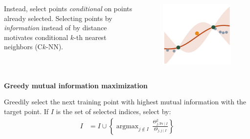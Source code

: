 \documentclass{beamer}                             %
\newcommand{\blocktitle}[1]{{\Large \textbf{#1}}}
\DeclareMathOperator*{\argmax}{argmax}
\begin{document}
\begin{frame}[t]
\begin{columns}[T]
\begin{column}{0.30\textwidth}
\begin{tcolorbox}
\begin{columns}
\begin{column}{0.5\textwidth}
        \vspace{\baselineskip}
        Instead, select points \emph{conditional} on points already selected.
        Selecting points by \emph{information} instead of by distance
        motivates conditional \( k \)-th nearest neighbors (C\( k \)-NN).
      \end{column}
      \begin{column}{0.5\textwidth}
        \begin{figure}[h!]
          \centering
          \includegraphics[width=\textwidth]{graphs/predict_cknn_2.png}
        \end{figure}
      \end{column}
    \end{columns}
  \end{tcolorbox}

  \begin{tcolorbox}
    \blocktitle{Greedy mutual information maximization}

    Greedily select the next training point with highest mutual
    information with the target point. If \( I \) is the set
    of selected indices, select by:
    \begin{align*}
      I &= I \cup
      \left \{
        \argmax_{j \not \in I} \:
          \frac{\Theta_{j, \text{Pr} \mid I}^2}{\Theta_{j, j \mid I}}
      \right \}
    \end{align*}
  \end{tcolorbox}
\end{column}


\end{columns}
\end{frame}
\end{document}
